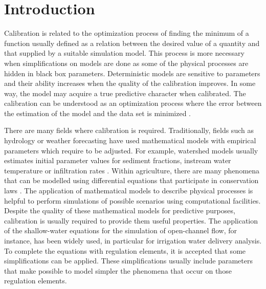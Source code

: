 \documentclass[review,authoryear]{elsarticle}
\begin{document}
\maketitle

\section{Introduction}

Calibration is related to the optimization process of finding the minimum of a
function usually defined as a relation between the desired value of a quantity
and that supplied by a suitable simulation model. This process is more necessary
when simplifications on models are done as some of the
physical processes are hidden in black box parameters. Deterministic models are
sensitive to parameters and their ability increases when the quality of the
calibration improves. In some way, the model may acquire a true predictive
character when calibrated. The calibration can be understood as an optimization
process where the error between the estimation of the model and the data set is
minimized \citep{Lacasta15}.

There are many fields where calibration is required. Traditionally, fields such
as hydrology or weather forecasting have used mathematical models with empirical
parameters which require to be adjusted. For example, watershed models usually
estimates initial parameter values for sediment fractions, instream water
temperature or infiltration rates \citep{Duan04}. Within agriculture, there are
many phenomena that can be modelled using differential equations that
participate in conservation laws
\citep{Playan06,JaviSurcos2,Ebrahimiam13,Ouazaa14,Ouazaa15,SedagatdoostEbraimian15}.
The application of
mathematical models to describe physical processes is helpful to perform
simulations of possible scenarios using computational facilities. Despite the
quality of these mathematical models for predictive purposes, calibration is
usually required to provide them useful properties. The application of the
shallow-water equations for the simulation of open-channel flow, for instance,
has been widely used, in particular for irrigation water delivery analysis. To
complete the equations with regulation elements, it is accepted that some
simplifications can be applied. These simplifications usually include parameters
that make possible to model simpler the phenomena that occur on those regulation
elements.
\end{document}
